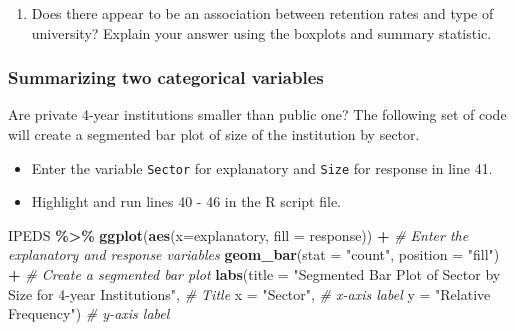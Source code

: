 \documentclass[
]{report}
\newenvironment{Shaded}{\begin{snugshade}}{\end{snugshade}}
\newcommand{\AttributeTok}[1]{\textcolor[rgb]{0.13,0.29,0.53}{#1}}
\newcommand{\CommentTok}[1]{\textcolor[rgb]{0.56,0.35,0.01}{\textit{#1}}}
\newcommand{\FunctionTok}[1]{\textcolor[rgb]{0.13,0.29,0.53}{\textbf{#1}}}
\newcommand{\NormalTok}[1]{#1}
\newcommand{\SpecialCharTok}[1]{\textcolor[rgb]{0.81,0.36,0.00}{\textbf{#1}}}
\newcommand{\StringTok}[1]{\textcolor[rgb]{0.31,0.60,0.02}{#1}}
\providecommand{\tightlist}{%
  \setlength{\itemsep}{0pt}\setlength{\parskip}{0pt}}
\begin{document}
\vspace{0.8in}

\begin{enumerate}
\def\labelenumi{\arabic{enumi}.}
\setcounter{enumi}{14}
\tightlist
\item
  Does there appear to be an association between retention rates and type of university? Explain your answer using the boxplots and summary statistic.
\end{enumerate}

\vspace{0.3in}

\hypertarget{summarizing-two-categorical-variables}{%
\subsubsection*{Summarizing two categorical variables}\label{summarizing-two-categorical-variables}}

Are private 4-year institutions smaller than public one? The following set of code will create a segmented bar plot of size of the institution by sector.

\begin{itemize}
\item
  Enter the variable \texttt{Sector} for explanatory and \texttt{Size} for response in line 41.
\item
  Highlight and run lines 40 - 46 in the R script file.
\end{itemize}

\begin{Shaded}
\begin{Highlighting}[]
\NormalTok{IPEDS }\SpecialCharTok{\%\textgreater{}\%}
  \FunctionTok{ggplot}\NormalTok{(}\FunctionTok{aes}\NormalTok{(}\AttributeTok{x=}\NormalTok{explanatory, }\AttributeTok{fill =}\NormalTok{ response)) }\SpecialCharTok{+} \CommentTok{\# Enter the explanatory and response variables}
  \FunctionTok{geom\_bar}\NormalTok{(}\AttributeTok{stat =} \StringTok{"count"}\NormalTok{, }\AttributeTok{position =} \StringTok{"fill"}\NormalTok{) }\SpecialCharTok{+} \CommentTok{\# Create a segmented bar plot}
  \FunctionTok{labs}\NormalTok{(}\AttributeTok{title =} \StringTok{"Segmented Bar Plot of Sector by Size for }
\StringTok{       4{-}year Institutions"}\NormalTok{, }\CommentTok{\# Title}
       \AttributeTok{x =} \StringTok{"Sector"}\NormalTok{, }\CommentTok{\# x{-}axis label}
       \AttributeTok{y =} \StringTok{"Relative Frequency"}\NormalTok{) }\CommentTok{\# y{-}axis label}
\end{Highlighting}
\end{Shaded}
\end{document}
